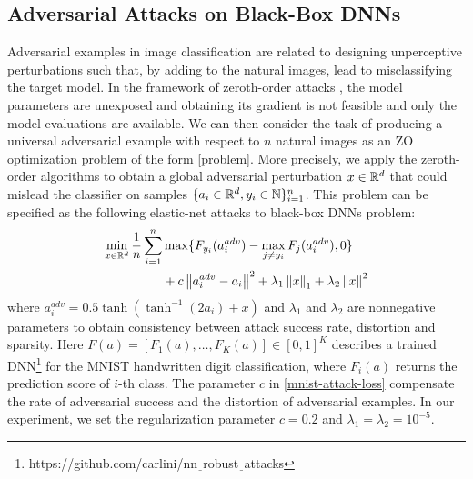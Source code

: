 \subsection{Adversarial Attacks on Black-Box DNNs}
Adversarial 
examples in image classification are related to designing unperceptive perturbations such that, by adding to the natural images, lead to misclassifying the target model. In the framework of zeroth-order attacks \cite{chen2017zoo,liu2018zeroth}, the model parameters are unexposed and obtaining its gradient is not feasible and only
the model evaluations are available. We can then consider the task of producing a universal adversarial
example with respect to $n$ natural images as an ZO optimization problem of the form \eqref{problem}.
More precisely, we apply the zeroth-order algorithms to obtain a global adversarial perturbation $x\in\mathbb{R}^d$ that could mislead the classifier on samples $\{a_i \in \mathbb{R}^d, y_i\in\mathbb{N} \}_{i=1}^n$. This problem can be specified as the following elastic-net attacks to black-box DNNs problem:
\begin{align}
\min_{x\in\mathbb{R}^d} \frac{1}{n} \sum_{i=1}^n& \max\{F_{y_i}(a_i^{adv}) - \max_{j\neq y_i}F_j(a_i^{adv}),0\}\notag\\
& + c\left\lVert a_i^{adv} - a_i\right\rVert^2 + \lambda_1 \left\lVert x\right\rVert_{1} + \lambda_2 \left\lVert x\right\rVert^{2}\label{mnist-attack-loss}
\end{align}
where $a_i^{adv} = 0.5\tanh(\tanh^{-1}(2a_i)+x)$ and $\lambda_1$ and $\lambda_2$ are nonnegative parameters to obtain consistency between attack success rate, distortion and sparsity. Here $F(a) = \left[F_1(a),\ldots,F_K(a)\right]\in [0, 1]^K$ describes a trained DNN{\footnote{https://github.com/carlini/nn$\underline{~~}$robust$\underline{~~}$attacks}} for the MNIST handwritten digit classification, where $F_i(a)$ returns the prediction score of $i$-th class. The parameter $c$ in \eqref{mnist-attack-loss} compensate the rate of adversarial success and the distortion of adversarial examples. In our experiment, we set the regularization parameter  $c = 0.2$ and $\lambda_1 = \lambda_2  = 10^{-5}$.
